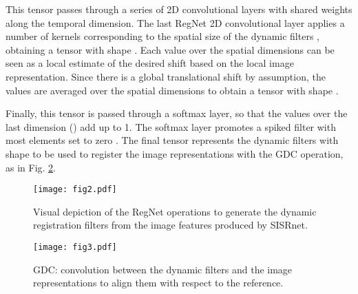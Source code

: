 \documentclass[journal]{IEEEtran}
\begin{document}
This tensor passes through a series of 2D convolutional layers with shared weights along the temporal dimension. 
The last RegNet 2D convolutional layer applies a number of kernels corresponding to the spatial size of the dynamic filters , obtaining a tensor with shape . Each value over the spatial dimensions can be seen as a local estimate of the desired shift based on the local image representation. Since there is a global translational shift by assumption, the values are averaged over the spatial dimensions to obtain a tensor with shape .

Finally, this tensor is passed through a softmax layer, so that the values over the last dimension () add up to 1. The softmax layer promotes a spiked filter with most elements set to zero \cite{Brabandere2016DynamicFN}.
The final tensor represents the  dynamic filters with shape  to be used to register the  image representations with the GDC operation, as in Fig. \ref{fig:DC}.
\begin{figure}[t]
\centering
\texttt{[image: fig2.pdf]}
\vspace{-0.15cm}
\caption{Visual depiction of the RegNet operations to generate the dynamic registration filters from the image features produced by SISRnet.}
\vspace{-0.15cm}
\label{fig:Detailed_Regnet}
\end{figure}

\begin{figure}[t]
\centering
\texttt{[image: fig3.pdf]}
\vspace{-0.15cm}
\caption{GDC: convolution between the dynamic filters and the image representations to align them with respect to the reference.}
\vspace{-0.15cm}
\label{fig:DC}
\end{figure}
\end{document}

